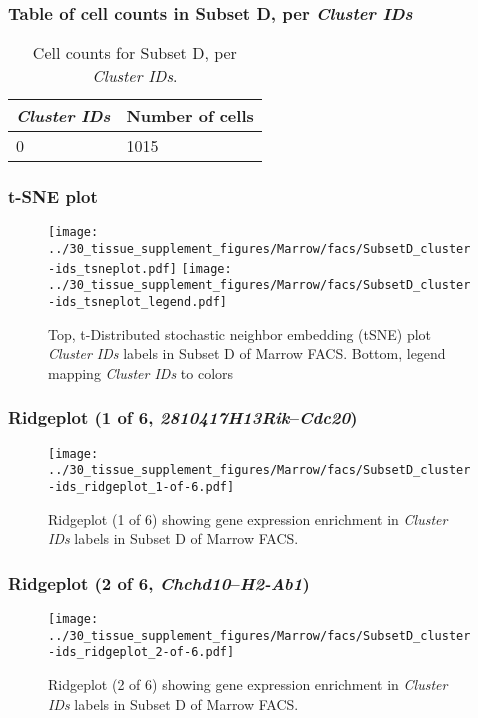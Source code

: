 \subsubsection{Table of cell counts in Subset D, per \emph{Cluster IDs}}\begin{table}[h]
\centering
\label{my-label}
\begin{tabular}{@{}ll@{}}
\toprule

\emph{Cluster IDs}& Number of cells \\ \midrule
0 & 1015 \\
\bottomrule
\end{tabular}
\caption{Cell counts for Subset D, per \emph{Cluster IDs}.}
\end{table}

\clearpage
\subsubsection{t-SNE plot}
\begin{figure}[h]
\centering
\texttt{[image: ../30\_tissue\_supplement\_figures/Marrow/facs/SubsetD\_cluster-ids\_tsneplot.pdf]}
\texttt{[image: ../30\_tissue\_supplement\_figures/Marrow/facs/SubsetD\_cluster-ids\_tsneplot\_legend.pdf]}
\caption{Top, t-Distributed stochastic neighbor embedding (tSNE) plot  \emph{Cluster IDs} labels in Subset D of Marrow FACS. Bottom, legend mapping \emph{Cluster IDs} to colors}
\end{figure}


\clearpage

\subsubsection{Ridgeplot (1 of 6, \emph{2810417H13Rik}--\emph{Cdc20})}
\begin{figure}[h]
\centering
\texttt{[image: ../30\_tissue\_supplement\_figures/Marrow/facs/SubsetD\_cluster-ids\_ridgeplot\_1-of-6.pdf]}

\caption{ Ridgeplot (1 of 6)  showing gene expression enrichment in \emph{Cluster IDs} labels in Subset D of Marrow FACS. }
\end{figure}


\clearpage

\subsubsection{Ridgeplot (2 of 6, \emph{Chchd10}--\emph{H2-Ab1})}
\begin{figure}[h]
\centering
\texttt{[image: ../30\_tissue\_supplement\_figures/Marrow/facs/SubsetD\_cluster-ids\_ridgeplot\_2-of-6.pdf]}

\caption{ Ridgeplot (2 of 6)  showing gene expression enrichment in \emph{Cluster IDs} labels in Subset D of Marrow FACS. }
\end{figure}


